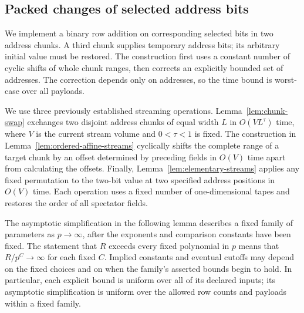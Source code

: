 \documentclass[11pt]{article}
\theoremstyle{definition}
\begin{document}
\subsection{Packed changes of selected address bits}
\label{sec:packed-selected-bits}

We implement a binary row addition on corresponding selected bits in two
address chunks. A third chunk supplies temporary address bits; its arbitrary
initial value must be restored. The construction first uses a constant number
of cyclic shifts of whole chunk ranges, then corrects an explicitly bounded set of
addresses. The correction depends only on addresses, so the time bound is
worst-case over all payloads.

We use three previously established streaming operations.
Lemma~\ref{lem:chunk-swap} exchanges two disjoint address chunks of
equal width $L$ in $O(VL^\tau)$ time, where $V$ is the current stream
volume and $0<\tau<1$ is fixed.  The construction in
Lemma~\ref{lem:ordered-affine-streams} cyclically shifts the complete
range of a target chunk by an offset determined by preceding fields in
$O(V)$ time apart from calculating the offsets.  Finally,
Lemma~\ref{lem:elementary-streams} applies any fixed permutation to the
two-bit value at two specified address positions in $O(V)$ time.
Each operation uses a fixed number of one-dimensional
tapes and restores the order of all spectator fields.

The asymptotic simplification in the following lemma describes a fixed
family of parameters as \(p\to\infty\), after the exponents and comparison
constants have been fixed.  The statement that \(R\) exceeds every fixed
polynomial in \(p\) means that \(R/p^C\to\infty\) for each fixed \(C\).
Implied constants and eventual cutoffs may depend on the fixed choices
and on when the family's asserted bounds begin to hold.  In particular,
each explicit bound is uniform over all of its declared inputs;
its asymptotic simplification is uniform over the allowed row counts
and payloads within a fixed family.
\end{document}
